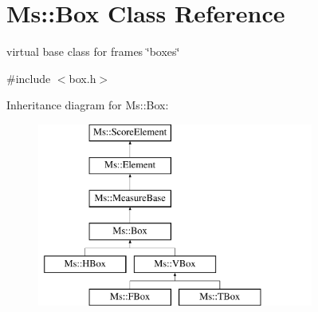 \hypertarget{class_ms_1_1_box}{}\section{Ms\+:\+:Box Class Reference}
\label{class_ms_1_1_box}


virtual base class for frames \char`\"{}boxes\char`\"{}  




{\ttfamily \#include $<$box.\+h$>$}

Inheritance diagram for Ms\+:\+:Box\+:\begin{figure}[H]
\begin{center}
\leavevmode
\includegraphics[height=6.000000cm]{class_ms_1_1_box}
\end{center}
\end{figure}
